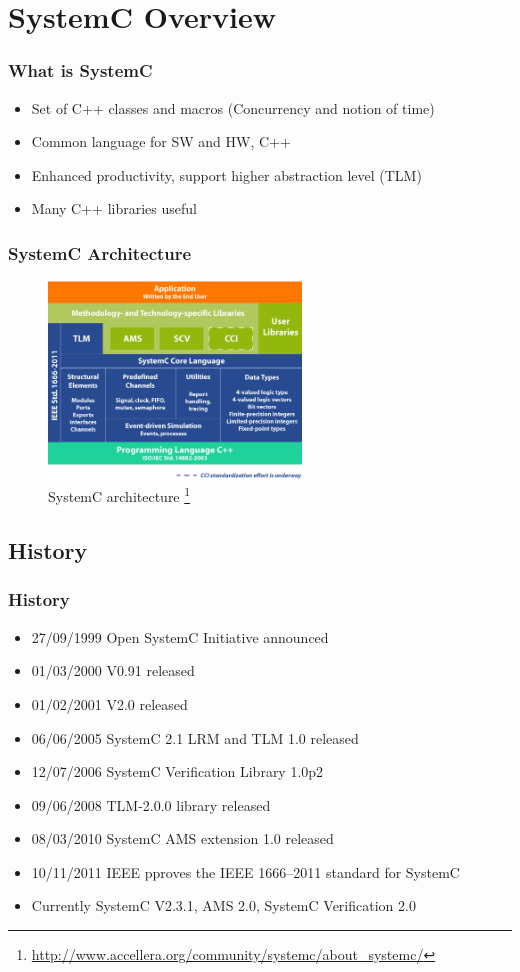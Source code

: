 \documentclass{beamer}
\begin{document}
\section{SystemC Overview}
\begin{frame}\frametitle{What is SystemC}
\begin{itemize}
	\item Set of C++ classes and macros (Concurrency and notion of time)
	\item Common language for SW and HW, C++
	\item Enhanced productivity, support higher abstraction level (TLM)
	\item Many C++ libraries useful
\end{itemize}
\end{frame}

\begin{frame}\frametitle{SystemC Architecture}
    \begin{figure}[hp]
	  \includegraphics[width=0.6\textwidth]{pictures/systemc-architecture}
      \caption{SystemC architecture \footnote{\url{http://www.accellera.org/community/systemc/about_systemc/}}}
      \label{fig:flow}
    \end{figure}
\end{frame}

\subsection{History}
\begin{frame}\frametitle{History} 
\begin{itemize}
	\item 27/09/1999 Open SystemC Initiative announced
	\item 01/03/2000 V0.91 released
	\item 01/02/2001 V2.0 released
	\item 06/06/2005 SystemC 2.1 LRM and TLM 1.0 released
	\item 12/07/2006 SystemC Verification Library 1.0p2
	\item 09/06/2008 TLM-2.0.0 library released
	\item 08/03/2010 SystemC AMS extension 1.0 released
	\item 10/11/2011 IEEE pproves the IEEE 1666–2011 standard for SystemC
	\item Currently SystemC V2.3.1, AMS 2.0, SystemC Verification 2.0
\end{itemize}
\end{frame}
\end{document}
